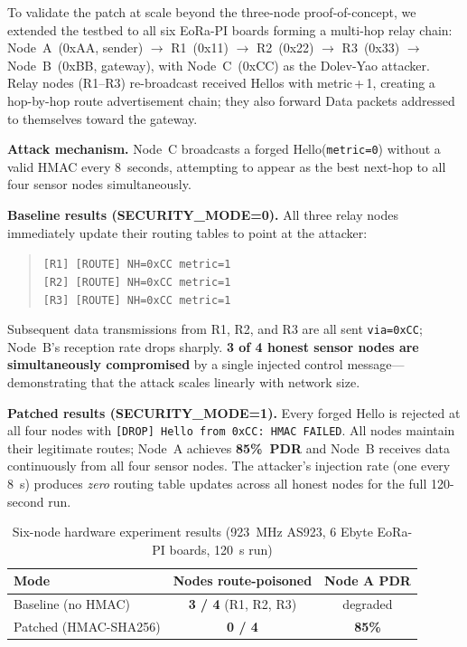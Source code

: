 \documentclass[10pt,journal,compsoc]{IEEEtran}
\begin{document}
To validate the patch at scale beyond the three-node proof-of-concept,
we extended the testbed to all six EoRa-PI boards forming a
multi-hop relay chain:
Node~A~(0xAA, sender) $\to$ R1~(0x11) $\to$ R2~(0x22) $\to$
R3~(0x33) $\to$ Node~B~(0xBB, gateway), with Node~C~(0xCC)
as the Dolev-Yao attacker.
Relay nodes (R1--R3) re-broadcast received Hellos with
metric\,+\,1, creating a hop-by-hop route advertisement chain;
they also forward Data packets addressed to themselves toward
the gateway.

\textbf{Attack mechanism.}
Node~C broadcasts a forged Hello(\texttt{metric=0}) without a
valid HMAC every 8~seconds, attempting to appear as the best
next-hop to all four sensor nodes simultaneously.

\textbf{Baseline results (SECURITY\_MODE=0).}
All three relay nodes immediately update their routing tables to
point at the attacker:
\begin{quote}\small
\texttt{[R1] [ROUTE] NH=0xCC metric=1}\\
\texttt{[R2] [ROUTE] NH=0xCC metric=1}\\
\texttt{[R3] [ROUTE] NH=0xCC metric=1}
\end{quote}
Subsequent data transmissions from R1, R2, and R3 are all sent
\texttt{via=0xCC}; Node~B's reception rate drops sharply.
\textbf{3 of 4 honest sensor nodes are simultaneously compromised}
by a single injected control message—demonstrating that the
attack scales linearly with network size.

\textbf{Patched results (SECURITY\_MODE=1).}
Every forged Hello is rejected at all four nodes with
\texttt{[DROP] Hello from 0xCC: HMAC FAILED}.
All nodes maintain their legitimate routes; Node~A achieves
\textbf{85\%~PDR} and Node~B receives data continuously from all
four sensor nodes.
The attacker's injection rate (one every 8~s) produces
\emph{zero} routing table updates across all honest nodes for the
full 120-second run.

\begin{table}[h]
  \centering
  \caption{Six-node hardware experiment results (923~MHz AS923, 6
           Ebyte EoRa-PI boards, 120~s run)}
  \label{tab:hw-e6}
  \begin{tabular}{lcc}
    \toprule
    \textbf{Mode} & \textbf{Nodes route-poisoned} & \textbf{Node A PDR} \\
    \midrule
    Baseline (no HMAC)   & \textbf{3 / 4} (R1, R2, R3)  & degraded \\
    Patched (HMAC-SHA256) & \textbf{0 / 4}               & \textbf{85\%} \\
    \bottomrule
  \end{tabular}
\end{table}
\end{document}
